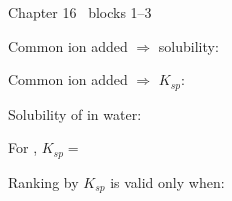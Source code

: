 \documentclass{apchem-worksheet}
\begin{document}
\begin{spiralstrip}{Chapter 16 \textbullet\ blocks 1--3}
  \item Common ion added $\Rightarrow$ solubility:
  \item Common ion added $\Rightarrow$ $K_{sp}$:
  \item Solubility of  in water:
  \item For , $K_{sp} = $ 
  \item Ranking by $K_{sp}$ is valid only when:
\end{spiralstrip}
\end{document}
